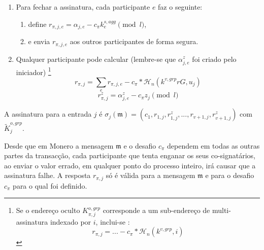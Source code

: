 \begin{enumerate}
    \item Para fechar a assinatura, cada participante $e$ faz o seguinte:
    \begin{enumerate}
        \item define $r_{\pi,j,e} = \alpha_{j,e} - c_{\pi} k^{s,agg}_e \pmod l$,
        \item e envia $r_{\pi,j,e}$ aos outros participantes de forma segura.
    \end{enumerate}
    \item Qualquer participante pode calcular (lembre-se que $\alpha^z_{j,e}$ foi criado pelo iniciador)
\footnote{Se o endereço oculto $K^{o,grp}_{\pi,j}$ corresponde a um sub-endereço de multi-assinatura indexado por $i$, inclui-se :
    \[r_{\pi,j} = ... - c_{\pi}*\mathcal{H}_n(k^{v,grp},i)\]}\vspace{.175cm}
    \[r_{\pi,j} = \sum_e r_{\pi,j,e} - c_{\pi}*\mathcal{H}_n(k^{v,grp} r G, u_j)\]
    \[r^{z}_{\pi,j} = \alpha^z_{j,e} - c_{\pi} z_j \pmod l\]
\end{enumerate}

A assinatura para a entrada $j$ é $\sigma_j(\mathfrak{m}) = (c_1,r_{1,j},r^{z}_{1,j},...,r_{v+1,j},r^{z}_{v+1,j})$ com $\tilde{K}^{o,grp}_j$. 

Desde que em Monero a mensagem $\mathfrak{m}$ e o desafio $c_{\pi}$ dependem em todas as outras partes da transacção, cada participante que tenta enganar os seus co-signatários, ao enviar o valor errado, em qualquer ponto do processo inteiro, irá causar que a assinatura falhe. A resposta $r_{\pi,j}$ só é válida para a mensagem $\mathfrak{m}$ e para o desafio $c_{\pi}$ para o qual foi definido. 



